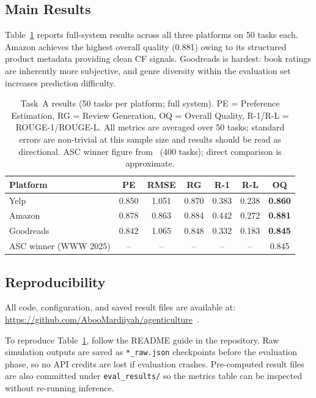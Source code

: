 \documentclass[11pt]{article}
\begin{document}
\subsection{Main Results}

Table~\ref{tab:main_results} reports full-system results across all three
platforms on 50 tasks each.
Amazon achieves the highest overall quality (0.881) owing to its structured
product metadata providing clean CF signals.
Goodreads is hardest: book ratings are inherently more subjective, and genre
diversity within the evaluation set increases prediction difficulty.

\begin{table}[t]
\centering
\setlength{\tabcolsep}{6pt}
\renewcommand{\arraystretch}{1.08}
\begin{tabular}{lcccccc}
\toprule
\textbf{Platform} & \textbf{PE} & \textbf{RMSE} & \textbf{RG}
                  & \textbf{R-1} & \textbf{R-L} & \textbf{OQ} \\
\midrule
Yelp      & 0.850 & 1.051 & 0.870 & 0.383 & 0.238 & \textbf{0.860} \\
Amazon    & 0.878 & 0.863 & 0.884 & 0.442 & 0.272 & \textbf{0.881} \\
Goodreads & 0.842 & 1.065 & 0.848 & 0.332 & 0.183 & \textbf{0.845} \\
\midrule
ASC winner (WWW 2025) & -- & -- & -- & -- & -- & 0.845 \\
\bottomrule
\end{tabular}
\caption{Task~A results (50 tasks per platform; full system).
  PE = Preference Estimation, RG = Review Generation, OQ = Overall Quality,
  R-1/R-L = ROUGE-1/ROUGE-L.
  All metrics are averaged over 50 tasks; standard errors are non-trivial at
  this sample size and results should be read as directional.
  ASC winner figure from~\citet{guo2025agentsocietychallenge} (400 tasks);
  direct comparison is approximate.}
\label{tab:main_results}
\end{table}
\FloatBarrier

\subsection{Reproducibility}

All code, configuration, and saved result files are available at:
\url{https://github.com/AbooMardiiyah/agenticulture}~\citep{aboomidou2026agenticulture}.

\noindent To reproduce Table~\ref{tab:main_results}, follow the README guide in the repository.
Raw simulation outputs are saved as \texttt{*\_raw.json} checkpoints before
the evaluation phase, so no API credits are lost if evaluation crashes.
Pre-computed result files are also committed under \texttt{eval\_results/}
so the metrics table can be inspected without re-running inference.
\end{document}
